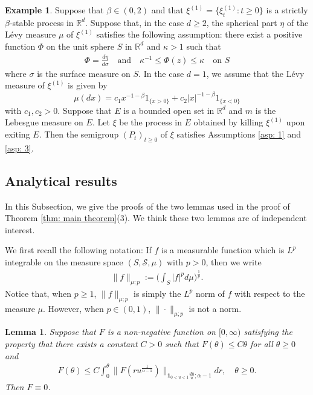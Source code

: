 \documentclass[12pt,a4paper]{amsart}
\newtheorem{lem}[thm]{Lemma}
\theoremstyle{definition}
\newtheorem{exa}[thm]{Example}
\numberwithin{equation}{section}
\begin{document}
\begin{exa}
  Suppose that $\beta\in (0, 2)$ and that $\xi^{(1)}=\{\xi^{(1)}_t: t\ge0\}$ is a strictly $\beta$-stable process in $\mathbb{R}^d$. 
  Suppose that, in the case $d\ge 2$, the spherical part $\eta$ of the L\'evy measure $\mu$ of $\xi^{(1)}$ satisfies the following assumption: 
  there exist a positive function $\Phi$ on the unit sphere $S$ in $\mathbb{R}^d$ and $\kappa>1$
such that
\begin{align}
  \Phi=\frac{d\eta}{d\sigma} \quad \text{and} \quad
  \kappa^{-1}\le \Phi(z)\le \kappa \quad \text{on } S
\end{align}
where $\sigma$ is the surface measure on $S$. In the case $d=1$, we assume that the L\'evy
measure of $\xi^{(1)}$ is given by
$$
\mu(dx)=c_1x^{-1-\beta}1_{\{x>0\}}+ c_2|x|^{-1-\beta}1_{\{x<0\}}
$$
with $c_1, c_2>0$. Suppose that $E$ is a bounded open set in $\mathbb{R}^d$
and $m$ is the Lebesgue measure on $E$.
Let $\xi$ be the process in $E$ obtained by killing $\xi^{(1)}$ upon exiting $E$.
Then the semigroup $(P_t)_{t\ge 0}$ of $\xi$ satisfies
Assumptions \ref{asp: 1} and \ref{asp: 3}.
\end{exa}

\subsection{Analytical results}
\label{sec: Characterizing the Zolotarev's distribution using an non-linear delay equation}
In this Subsection, we give the proofs of the two lemmas used in the proof of Theorem \ref{thm: main theorem}(3). We think these two lemmas are of independent interest.

We first recall the following notation:
If $f$ is a measurable function which is $L^p$ integrable on the measure space $(S,\mathscr S,\mu)$ with $p > 0$, then we write
\begin{align}
	\|f\|_{\mu;p}
	:= \Big(\int_{S} |f|^p d\mu \Big)^{\frac{1}{p}}.
\end{align}
Notice that, when $p\geq 1$, $\|f\|_{\mu;p}$ is simply the $L^p$ norm of $f$ with respect to the measure $\mu$.	
However, when $p \in (0,1)$, $\|\cdot\|_{\mu; p}$ is not a norm.

\begin{lem}\label{lem: F is zero}
	Suppose that $F$ is a non-negative function on $[0,\infty)$ satisfying the property that there exists a constant $C>0$ such that  $F(\theta) \leq C\theta$ for all $\theta \geq 0$ and
  \begin{align}
    \label{eq:Gronwall_inequlity}
    F(\theta)
    \leq C \int_0^\theta \|  F(ru^{ \frac{1}{\alpha - 1}  })\|_{\mathbf 1_{0<u<1}\frac{du}{u}; \alpha - 1} dr, \quad \theta \geq 0.
  \end{align}
	Then $F \equiv 0$.
\end{lem}
\end{document}
